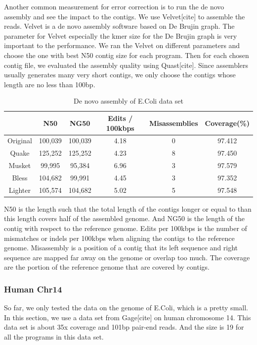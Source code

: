 \documentclass[10pt]{article}
\begin{document}
Another common measurement for error correction is to run the de novo assembly and see the impact to the contigs. We use Velvet[cite] to assemble the reads. Velvet is a de novo assembly software based on De Brujin graph. The parameter for Velvet especially the kmer size for the De Brujin graph is very important to the performance. We ran the Velvet on different parameters and choose the one with best N50 contig size for each program. Then for each chosen contig file, we evaluated the assembly quality using Quast[cite]. Since assemblers usually generates many very short contigs, we only choose the contigs whose length are no less than 100bp.

\begin{table}
\begin{tabular}{|c|c|c|c|c|c|} \hline
	 	& N50 &	NG50	 & Edits / 100kbps&	Misassemblies	& Coverage(\%) \\ \hline
Original	& 100,039	& 100,039	& 4.18	& 0	& 97.412 \\ \hline
Quake	& 125,252	& 125,252	& 4.23	& 8	& 97.450 \\ \hline
Musket	& 99,995	& 95,384	& 6.96	& 3	& 97.579 \\ \hline
Bless	& 104,682	& 99,991	& 4.45	& 3	& 97.352 \\ \hline
Lighter &	105,574	& 104,682	& 5.02	& 5	& 97.548 \\ \hline
\end{tabular}
\caption{De novo assembly of E.Coli data set\label{table:ecoli_assembly}}
\end{table}

N50 is the length such that the total length of the contigs longer or equal to than this length covers half of the assembled genome. And NG50 is the length of the contig with respect to the reference genome. Edits per 100kbps is the number of mismatches or indels per 100kbps when aligning the contigs to the reference genome. Misassembly is a position of a contig that its left sequence and right sequence are mapped far away on the genome or overlap too much. The coverage are the portion of the reference genome that are covered by contigs.

\subsubsection*{Human Chr14}
So far, we only tested the data on the genome of E.Coli, which is a pretty small. In this section, we use a data set from Gage[cite] on human chromosome 14. This data set is about 35x coverage and 101bp pair-end reads. And the \kmer size is 19 for all the programs in this data set.
\end{document}
